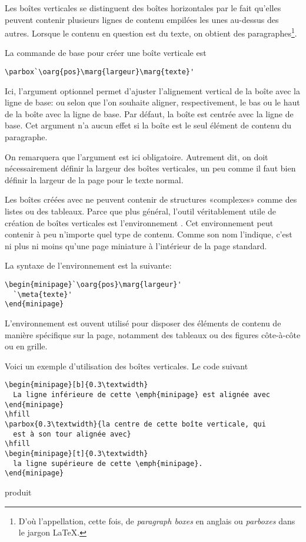 Les boîtes verticales se distinguent des boîtes horizontales par le
fait qu'elles peuvent contenir plusieurs lignes de contenu empilées
les unes au-dessus des autres. Lorsque le contenu en question est du
texte, on obtient des paragraphes\footnote{%
  D'où l'appellation, cette fois, de \emph{paragraph boxes} en anglais
  ou \emph{parboxes} dans le jargon {\LaTeX}.}. %

La commande de base pour créer une boîte verticale est
\begin{lstlisting}
\parbox`\oarg{pos}\marg{largeur}\marg{texte}'
\end{lstlisting}
Ici, l'argument optionnel  permet d'ajuster l'alignement
vertical de la boîte avec la ligne de base:  ou  selon
que l'on souhaite aligner, respectivement, le bas ou le haut de la
boîte avec la ligne de base. Par défaut, la boîte est centrée avec la
ligne de base. Cet argument n'a aucun effet si la boîte est le seul
élément de contenu du paragraphe.

On remarquera que l'argument  est ici obligatoire.
Autrement dit, on doit nécessairement définir la largeur des boîtes
verticales, un peu comme il faut bien définir la largeur de la page
pour le texte normal.

Les boîtes créées avec \cmd{\parbox} ne peuvent contenir de structures
«complexes» comme des listes ou des tableaux. Parce que plus général,
l'outil véritablement utile de création de boîtes verticales est
l'environnement . Cet environnement peut contenir à peu
n'importe quel type de contenu. Comme son nom l'indique, c'est ni plus
ni moins qu'une page miniature à l'intérieur de la page standard.

La syntaxe de l'environnement  est la suivante:
\begin{lstlisting}
\begin{minipage}`\oarg{pos}\marg{largeur}'
  `\meta{texte}'
\end{minipage}
\end{lstlisting}

L'environnement  est ouvent utilisé pour disposer des
éléments de contenu de manière spécifique sur la page, notamment des
tableaux ou des figures côte-à-côte ou en grille.

Voici un exemple d'utilisation des boîtes verticales. Le code suivant

\begin{lstlisting}
\begin{minipage}[b]{0.3\textwidth}
  La ligne inférieure de cette \emph{minipage} est alignée avec
\end{minipage}
\hfill
\parbox{0.3\textwidth}{la centre de cette boîte verticale, qui
  est à son tour alignée avec}
\hfill
\begin{minipage}[t]{0.3\textwidth}
  la ligne supérieure de cette \emph{minipage}.
\end{minipage}
\end{lstlisting}
produit \\
\medskip


